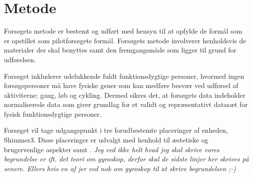 
\section{Metode}
Forsøgets metode er bestemt og udført med hensyn til at opfylde de formål som er opstillet som pilotforsøgets formål. \newline
Forsøgets metode involverer henholdsvis de materialer der skal benyttes samt den fremgangsmåde som ligger til grund for udførelsen.

Forsøget inkluderer udelukkende fuldt funktionsdygtige personer, hvormed ingen forsøgspersoner må have fysiske gener som kan medføre besvær ved udførsel af aktiviterne; gang, løb og cykling. Dermed sikres det, at forsøgets data indeholder normaliserede data som giver grundlag for et validt og repræsentativt datasæt for fysisk funktionsdygtige personer. 

Forsøget vil tage udgangspunkt i tre forudbestemte placeringer af enheden, Shimmer3. Disse placeringer er udvalgt med henhold til æstetiske og brugervenlige aspekter samt . \newline
\textit{Jeg ved ikke helt hvad jeg skal skrive vores begrundelse er ift. det teori om gyroskop, derfor skal de sidste linjer her skrives på senere. Ellers hvis en af jer ved nok om gyroskop til at skrive begrundelsen ;-)}
 

